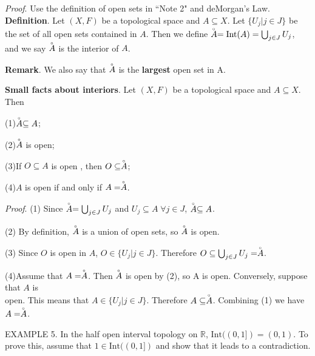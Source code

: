 \documentclass{article}
\begin{document}
 \noindent \textit{Proof}. Use the definition of open sets in ``Note
 2"
  and deMorgan's Law.\vspace{4mm}
  \\ \textbf{Definition}. \quad Let $(X,F)$ be a topological space
  and $A \subseteq X$. Let $\lbrace U_j| j \in J \rbrace$ be the set of all open
  sets contained in $A$. Then we define $ \buildrel _\circ \over {A} =
  \mathrm{Int}(A) = \bigcup_{j \in J} U_j$, and we say $\buildrel _\circ \over
  {A}$ is the interior of $A$.

  \noindent \textbf{Remark}. \quad We also say that $\buildrel _\circ \over
  {A}$ is the \textbf{largest} open set in A.\vspace{4mm}

  \noindent \textbf{Small facts about interiors}. \quad Let $(X,F)$
  be a topological space and $A \subseteq X$. Then \vspace{2mm}

  (1)$\buildrel _\circ \over{A} \subseteq A$;

  (2)$\buildrel _\circ \over{A}$ is open;

  (3)If $O \subseteq A$ is open , then $O \subseteq \buildrel _\circ \over
  {A}$;

  (4)$A$ is open if and only if $A=\buildrel _\circ \over
  {A}$. \vspace{2mm}

 \noindent \textit{Proof}. (1) Since $\buildrel _\circ \over{A} = \bigcup_{j
  \in J} U_j$ and $U_j \subseteq A \; \forall j \in J$, $\buildrel _\circ \over{A} \subseteq
  A$.

  (2) By definition, $\buildrel _\circ \over{A}$ is a union of open
  sets, so $\buildrel _\circ \over{A}$ is open.

  (3) Since $O$ is open in $A$, $O \in \lbrace U_j|j \in J \rbrace.$
  Therefore $O \subseteq \bigcup_{j \in J} U_j = \buildrel _\circ
  \over{A}$.

  (4)Assume that $A=\buildrel _\circ \over
  {A}$. Then $\buildrel _\circ \over{A}$ is open by (2), so A is
  open. Conversely, suppose that $A$ is \\ \indent open. This means that $A
  \in \lbrace U_j| j \in J \rbrace$. Therefore $A \subseteq \buildrel _\circ
  \over{A}$. Combining (1) we have $A=\buildrel _\circ \over
  {A}$. \vspace{4mm}

  \noindent EXAMPLE 5. \quad In the half open interval topology on
  $\mathbb{R}$, $\mathrm{Int}((0,1\rbrack)=(0,1)$. To prove this, assume that $1 \in
  \mathrm{Int}((0,1\rbrack)$ and show that it leads to a
  contradiction.\vspace{4mm}
\end{document}
